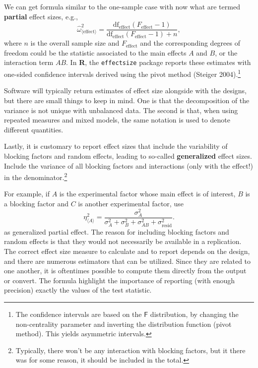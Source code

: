 \documentclass[
  11pt,
  letterpaper,
]{scrbook}
\theoremstyle{definition}
\theoremstyle{remark}
\begin{document}
We can get formula similar to the one-sample case with now what are
termed \textbf{partial} effect sizes, e.g.,
\[\widehat{\omega}^2_{\langle \text{effect} \rangle} = \frac{\text{df}_{\text{effect}}(F_{\text{effect}}-1)}{\text{df}_{\text{effect}}(F_{\text{effect}}-1) + n},\]
where \(n\) is the overall sample size and \(F_\text{effect}\) and the
corresponding degrees of freedom could be the statistic associated to
the main effects \(A\) and \(B\), or the interaction term \(AB\). In
\textbf{R}, the \texttt{effectsize} package reports these estimates with
one-sided confidence intervals derived using the pivot method (Steiger
2004).\footnote{The confidence intervals are based on the \(\mathsf{F}\)
  distribution, by changing the non-centrality parameter and inverting
  the distribution function (pivot method). This yields asymmetric
  intervals.}

Software will typically return estimates of effect size alongside with
the designs, but there are small things to keep in mind. One is that the
decomposition of the variance is not unique with unbalanced data. The
second is that, when using repeated measures and mixed models, the same
notation is used to denote different quantities.

Lastly, it is customary to report effect sizes that include the
variability of blocking factors and random effects, leading to so-called
\textbf{generalized} effect sizes. Include the variance of all blocking
factors and interactions (only with the effect!) in the
denominator.\footnote{Typically, there won't be any interaction with
  blocking factors, but it there was for some reason, it should be
  included in the total.}

For example, if \(A\) is the experimental factor whose main effect is of
interest, \(B\) is a blocking factor and \(C\) is another experimental
factor, use
\[\eta_{\langle A \rangle}^2 = \frac{\sigma^2_A}{\sigma^2_A + \sigma^2_B + \sigma^2_{AB} + \sigma^2_{\text{resid}}}.\]
as generalized partial effect. The reason for including blocking factors
and random effects is that they would not necessarily be available in a
replication. The correct effect size measure to calculate and to report
depends on the design, and there are numerous estimators that can be
utilized. Since they are related to one another, it is oftentimes
possible to compute them directly from the output or convert. The
formula highlight the importance of reporting (with enough precision)
exactly the values of the test statistic.
\end{document}
